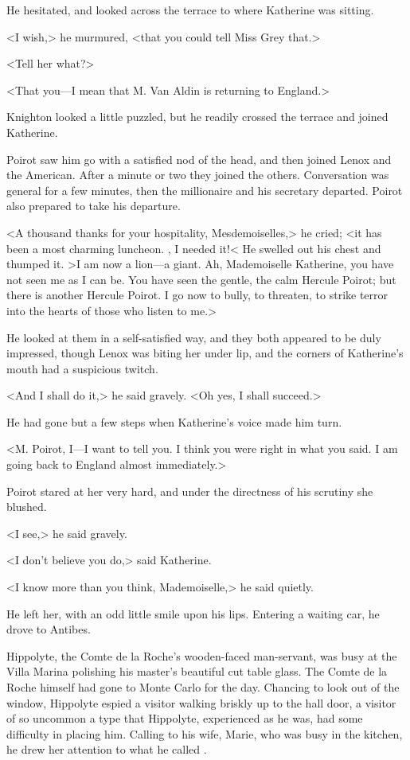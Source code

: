 He hesitated, and looked across the terrace to where Katherine was sitting.

<I wish,> he murmured, <that you could tell Miss Grey that.>

<Tell her what?>

<That you—I mean that M. Van Aldin is returning to England.>

Knighton looked a little puzzled, but he readily crossed the terrace and joined Katherine.

Poirot saw him go with a satisfied nod of the head, and then joined Lenox and the American. After a minute or two they joined the others. Conversation was general for a few minutes, then the millionaire and his secretary departed. Poirot also prepared to take his departure.

<A thousand thanks for your hospitality, Mesdemoiselles,> he cried; <it has been a most charming luncheon. , I needed it!< He swelled out his chest and thumped it. >I am now a lion—a giant. Ah, Mademoiselle Katherine, you have not seen me as I can be. You have seen the gentle, the calm Hercule Poirot; but there is another Hercule Poirot. I go now to bully, to threaten, to strike terror into the hearts of those who listen to me.>

He looked at them in a self-satisfied way, and they both appeared to be duly impressed, though Lenox was biting her under lip, and the corners of Katherine's mouth had a suspicious twitch.

<And I shall do it,> he said gravely. <Oh yes, I shall succeed.>

He had gone but a few steps when Katherine's voice made him turn.

<M. Poirot, I—I want to tell you. I think you were right in what you said. I am going back to England almost immediately.>

Poirot stared at her very hard, and under the directness of his scrutiny she blushed.

<I see,> he said gravely.

<I don't believe you do,> said Katherine.

<I know more than you think, Mademoiselle,> he said quietly.

He left her, with an odd little smile upon his lips. Entering a waiting car, he drove to Antibes.

Hippolyte, the Comte de la Roche's wooden-faced man-servant, was busy at the Villa Marina polishing his master's beautiful cut table glass. The Comte de la Roche himself had gone to Monte Carlo for the day. Chancing to look out of the window, Hippolyte espied a visitor walking briskly up to the hall door, a visitor of so uncommon a type that Hippolyte, experienced as he was, had some difficulty in placing him. Calling to his wife, Marie, who was busy in the kitchen, he drew her attention to what he called .

